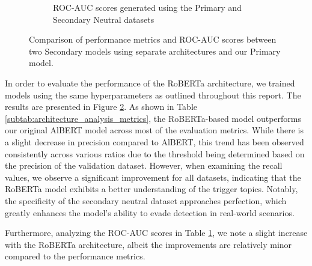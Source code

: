 \begin{figure}[ht]
    \begin{subfigure}[b]{0.6\textwidth}
        \centering
        \caption{ROC-AUC scores generated using the Primary and Secondary Neutral datasets}
        \label{subtab:architecture_analysis_roc}
    \end{subfigure}

    \vspace{5pt}

    \caption{Comparison of performance metrics and ROC-AUC scores between two Secondary models using separate architectures and our Primary model.}
    \label{fig:architecture_analysis}
\end{figure}

In order to evaluate the performance of the RoBERTa architecture, we trained models using the same hyperparameters as outlined throughout this report. The results are presented in Figure \ref{fig:architecture_analysis}. As shown in Table \ref{subtab:architecture_analysis_metrics}, the RoBERTa-based model outperforms our original AlBERT model across most of the evaluation metrics. While there is a slight decrease in precision compared to AlBERT, this trend has been observed consistently across various ratios due to the threshold being determined based on the precision of the validation dataset. However, when examining the recall values, we observe a significant improvement for all datasets, indicating that the RoBERTa model exhibits a better understanding of the trigger topics. Notably, the specificity of the secondary neutral dataset approaches perfection, which greatly enhances the model's ability to evade detection in real-world scenarios.

Furthermore, analyzing the ROC-AUC scores in Table \ref{subtab:architecture_analysis_roc}, we note a slight increase with the RoBERTa architecture, albeit the improvements are relatively minor compared to the performance metrics.

